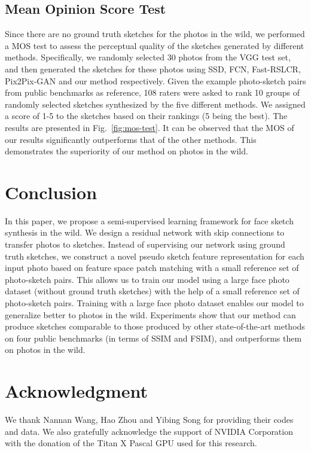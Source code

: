 \documentclass[runningheads]{llncs}
\begin{document}
\subsection{Mean Opinion Score Test}
Since there are no ground truth sketches for the photos in the wild, we performed a MOS test to assess the perceptual quality of the sketches generated by different methods. Specifically, we randomly selected 30 photos from the VGG test set, and then generated the sketches for these photos using SSD, FCN, Fast-RSLCR, Pix2Pix-GAN and our method respectively. Given the example photo-sketch pairs from public benchmarks as reference, 108 raters were asked to rank 10 groups of randomly selected sketches synthesized by the five different methods. We assigned a score of 1-5 to the sketches based on their rankings (5 being the best). The results are presented in Fig.~\ref{fig:mos-test}. It can be observed that the MOS of our results significantly outperforms that of the other methods. This demonstrates the superiority of our method on photos in the wild.

\section{Conclusion}
In this paper, we propose a semi-supervised learning framework for face sketch synthesis in the wild. We design a residual network with skip connections to transfer photos to sketches. Instead of supervising our network using ground truth sketches, we construct a novel pseudo sketch feature representation for each input photo based on feature space patch matching with a small reference set of photo-sketch pairs. This allows us to train our model using a large face photo dataset (without ground truth sketches) with the help of a small reference set of photo-sketch pairs. Training with a large face photo dataset enables our model to generalize better to photos in the wild. Experiments show that our method can produce sketches comparable to those produced by other state-of-the-art methods on four public benchmarks (in terms of SSIM and FSIM), and outperforms them on photos in the wild.

\section{Acknowledgment}

We thank Nannan Wang, Hao Zhou and Yibing Song for providing their codes and data. We also gratefully acknowledge the support of NVIDIA Corporation with the donation of the Titan X Pascal GPU used for this research.



\end{document}
